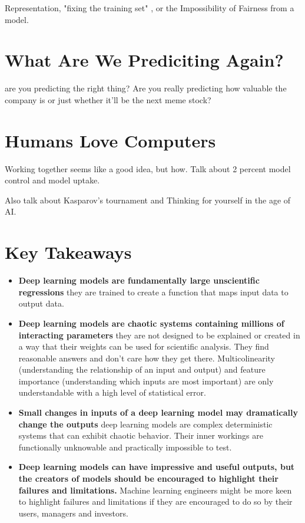 Representation, "fixing the training set" , or the Impossibility of Fairness from a model.

\section{What Are We Prediciting Again?}

are you predicting the right thing? Are you really predicting how valuable the company is or just whether it'll be the next meme stock?

\section{Humans Love Computers}

Working together seems like a good idea, but how. Talk about 2 percent model control and model uptake. 

Also talk about Kasparov's tournament and Thinking for yourself in the age of AI. 

\section{Key Takeaways}

\begin{itemize}
    \item \textbf{Deep learning models are fundamentally large unscientific regressions} they are trained to create a function that maps input data to output data.
    \item \textbf{Deep learning models are chaotic systems containing millions of interacting parameters} they are not designed to be explained or created in a way that their weights can be used for scientific analysis. They find reasonable answers and don't care how they get there. Multicolinearity (understanding the relationship of an input and output) and feature importance (understanding which inputs are most important) are only understandable with a high level of statistical error.
    \item \textbf{Small changes in inputs of a deep learning model may dramatically change the outputs} deep learning models are complex deterministic systems that can exhibit chaotic behavior. Their inner workings are functionally unknowable and practically impossible to test.
    \item \textbf{Deep learning models can have impressive and useful outputs, but the creators of models should be encouraged to highlight their failures and limitations.} Machine learning engineers might be more keen to highlight failures and limitations if they are encouraged to do so by their users, managers and investors.
\end{itemize}

